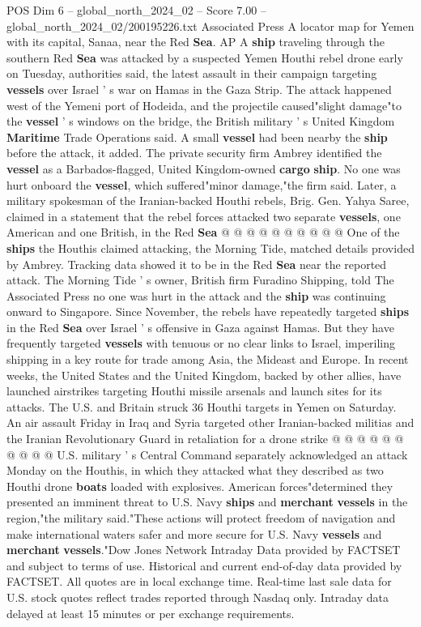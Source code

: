\begin{textsample}{POS Dim 6 – global\_north\_2024\_02 – Score 7.00 – global\_north\_2024\_02/200195226.txt}  \label{ex:f6_pos_178}
Associated Press A locator map for Yemen with its capital, Sanaa, near the Red \textbf{Sea}.
AP A \textbf{ship} traveling through the southern Red \textbf{Sea} was attacked by a suspected Yemen Houthi rebel drone early on Tuesday, authorities said, the latest assault in their campaign targeting \textbf{vessels} over Israel ' s war on Hamas in the Gaza Strip.
The attack happened west of the Yemeni port of Hodeida, and the projectile caused"slight damage"to the \textbf{vessel} ' s windows on the bridge, the British military ' s United Kingdom \textbf{Maritime} Trade Operations said.
A small \textbf{vessel} had been nearby the \textbf{ship} before the attack, it added.
The private security firm Ambrey identified the \textbf{vessel} as a Barbados-flagged, United Kingdom-owned \textbf{cargo} \textbf{ship}.
No one was hurt onboard the \textbf{vessel}, which suffered"minor damage,"the firm said.
Later, a military spokesman of the Iranian-backed Houthi rebels, Brig.
Gen.
Yahya Saree, claimed in a statement that the rebel forces attacked two separate \textbf{vessels}, one American and one British, in the Red \textbf{Sea} @ @ @ @ @ @ @ @ @ @ One of the \textbf{ships} the Houthis claimed attacking, the Morning Tide, matched details provided by Ambrey.
Tracking data showed it to be in the Red \textbf{Sea} near the reported attack.
The Morning Tide ' s owner, British firm Furadino Shipping, told The Associated Press no one was hurt in the attack and the \textbf{ship} was continuing onward to Singapore.
Since November, the rebels have repeatedly targeted \textbf{ships} in the Red \textbf{Sea} over Israel ' s offensive in Gaza against Hamas.
But they have frequently targeted \textbf{vessels} with tenuous or no clear links to Israel, imperiling shipping in a key route for trade among Asia, the Mideast and Europe.
In recent weeks, the United States and the United Kingdom, backed by other allies, have launched airstrikes targeting Houthi missile arsenals and launch sites for its attacks.
The U.S. and Britain struck 36 Houthi targets in Yemen on Saturday.
An air assault Friday in Iraq and Syria targeted other Iranian-backed militias and the Iranian Revolutionary Guard in retaliation for a drone strike @ @ @ @ @ @ @ @ @ @ U.S. military ' s Central Command separately acknowledged an attack Monday on the Houthis, in which they attacked what they described as two Houthi drone \textbf{boats} loaded with explosives.
American forces"determined they presented an imminent threat to U.S.
Navy \textbf{ships} and \textbf{merchant} \textbf{vessels} in the region,"the military said."These actions will protect freedom of navigation and make international waters safer and more secure for U.S.
Navy \textbf{vessels} and \textbf{merchant} \textbf{vessels}."Dow Jones Network Intraday Data provided by FACTSET and subject to terms of use.
Historical and current end-of-day data provided by FACTSET.
All quotes are in local exchange time.
Real-time last sale data for U.S. stock quotes reflect trades reported through Nasdaq only.
Intraday data delayed at least 15 minutes or per exchange requirements.

\end{textsample}
